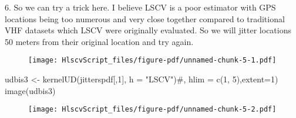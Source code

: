 \documentclass[
  letterpaper,
]{book}
\newenvironment{Shaded}{\begin{snugshade}}{\end{snugshade}}
\newcommand{\AttributeTok}[1]{\textcolor[rgb]{0.40,0.45,0.13}{#1}}
\newcommand{\CommentTok}[1]{\textcolor[rgb]{0.37,0.37,0.37}{#1}}
\newcommand{\DecValTok}[1]{\textcolor[rgb]{0.68,0.00,0.00}{#1}}
\newcommand{\FunctionTok}[1]{\textcolor[rgb]{0.28,0.35,0.67}{#1}}
\newcommand{\NormalTok}[1]{\textcolor[rgb]{0.00,0.23,0.31}{#1}}
\newcommand{\OtherTok}[1]{\textcolor[rgb]{0.00,0.23,0.31}{#1}}
\newcommand{\SpecialCharTok}[1]{\textcolor[rgb]{0.37,0.37,0.37}{#1}}
\newcommand{\StringTok}[1]{\textcolor[rgb]{0.13,0.47,0.30}{#1}}
\begin{document}
6. So we can try a trick here. I believe LSCV is a poor estimator with
GPS locations being too numerous and very close together compared to
traditional VHF datasets which LSCV were originally evaluated. So we
will jitter locations 50 meters from their original location and try
again.

\begin{Shaded}
\end{Shaded}

\begin{figure}[H]

{\centering \texttt{[image: HlscvScript\_files/figure-pdf/unnamed-chunk-5-1.pdf]}

}

\end{figure}

\begin{Shaded}
\begin{Highlighting}[]
\NormalTok{udbis3 }\OtherTok{\textless{}{-}} \FunctionTok{kernelUD}\NormalTok{(jitterspdf[,}\DecValTok{1}\NormalTok{], }\AttributeTok{h =} \StringTok{"LSCV"}\NormalTok{)}\CommentTok{\#, hlim = c(1, 5),extent=1)}
\FunctionTok{image}\NormalTok{(udbis3)}
\end{Highlighting}
\end{Shaded}

\begin{figure}[H]

{\centering \texttt{[image: HlscvScript\_files/figure-pdf/unnamed-chunk-5-2.pdf]}

}

\end{figure}
\end{document}
